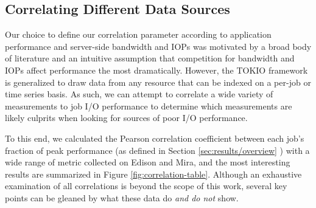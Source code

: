 \documentclass[conference,10pt,compsocconf]{IEEEtran}
\begin{document}
\subsection{Correlating Different Data Sources} \label{sec:results/correlating}

Our choice to define our correlation parameter according to application performance and server-side bandwidth and IOPs was motivated by a broad body of literature and an intuitive assumption that competition for bandwidth and IOPs affect performance the most dramatically.  However, the TOKIO framework is generalized to draw data from any resource that can be indexed on a per-job or time series basis. As such, we can attempt to correlate a wide variety of measurements to job I/O performance to determine which measurements are likely culprits when looking for sources of poor I/O performance.

To this end, we calculated the Pearson correlation coefficient between each job's fraction of peak performance (as defined in Section \ref{sec:results/overview} ) with a wide range of metric collected on Edison and Mira, and the most interesting results are summarized in Figure \ref{fig:correlation-table}.  Although an exhaustive examination of all correlations is beyond the scope of this work, several key points can be gleaned by what these data do \emph{and do not} show.
\end{document}
